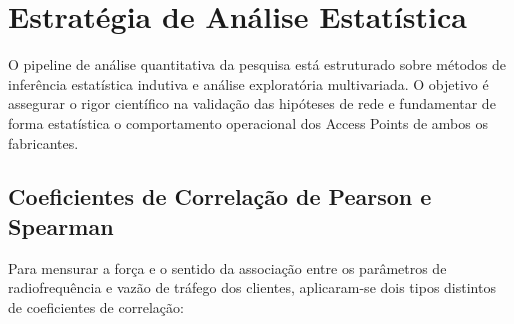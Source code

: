 \section{Estratégia de Análise Estatística}
\label{sec:metodologia_estrategia}

O pipeline de análise quantitativa da pesquisa está estruturado sobre métodos de inferência estatística indutiva e análise exploratória multivariada. O objetivo é assegurar o rigor científico na validação das hipóteses de rede e fundamentar de forma estatística o comportamento operacional dos Access Points de ambos os fabricantes.

\subsection{Coeficientes de Correlação de Pearson e Spearman}
\label{subsec:metodologia_correlacao_teoria}

Para mensurar a força e o sentido da associação entre os parâmetros de radiofrequência e vazão de tráfego dos clientes, aplicaram-se dois tipos distintos de coeficientes de correlação:

